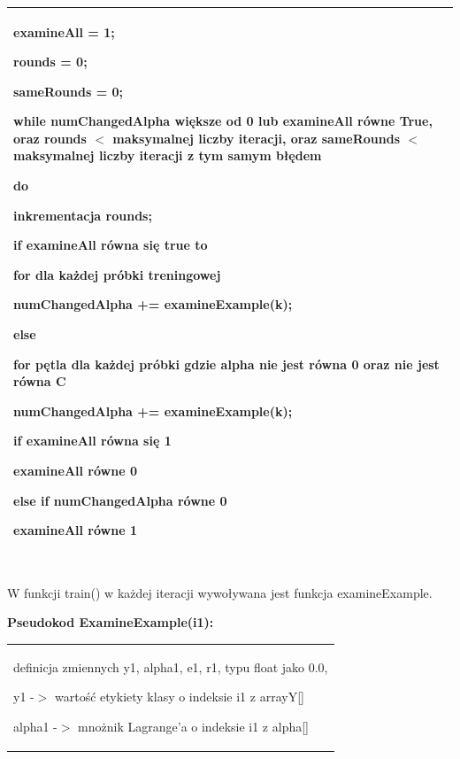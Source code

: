 \documentclass[11pt]{article}
\begin{document}
\begin{enumerate}
\begin{tabular}{|p{11.5cm}|}
 examineAll = 1;

 rounds = 0;

 sameRounds = 0;

\noindent \textbf{while} numChangedAlpha większe od 0 lub examineAll równe True, oraz rounds $<$ maksymalnej liczby iteracji, oraz sameRounds $<$ maksymalnej liczby iteracji z tym samym błędem

 \hspace{1em}do 

  \hspace{2em}inkrementacja rounds;

  \hspace{2em}\textbf{if} examineAll równa się true to

   \hspace{3em}for dla ka\.{z}dej próbki treningowej

    \hspace{4em}numChangedAlpha += examineExample(k);

  \hspace{2em}\textbf{else}

   \hspace{3em}for pętla dla każdej próbki gdzie alpha nie jest równa 0 oraz nie jest równa C

   \hspace{4em}numChangedAlpha += examineExample(k);

  \hspace{2em}\textbf{if} examineAll równa si\k{e} 1

   \hspace{3em}examineAll równe 0

  \hspace{2em}\textbf{else if} numChangedAlpha równe 0 

   \hspace{3em}examineAll równe 1
\\ \hline
\end{tabular}
 \\ W funkcji train() w każdej iteracji wywoływana jest funkcja examineExample.

 
\newpage
\noindent 
\noindent \textbf{Pseudokod ExamineExample(i1):}\\
\begin{tabular}{|p{11.5cm}|} \hline
\noindent definicja zmiennych y1, alpha1, e1, r1, typu float jako 0.0,

\noindent y1 -$>$ warto\'{s}\'{c} etykiety klasy o indeksie i1 z arrayY[]

\noindent alpha1 -$>$ mnożnik Lagrange'a o indeksie i1 z alpha[]


\end{tabular}
\end{enumerate}
\end{document}
